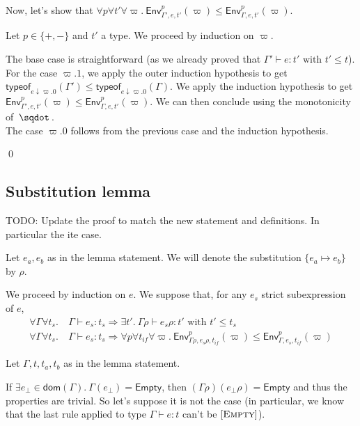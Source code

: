 \documentclass[a4paper]{article}%
\newcommand{\worra}[2]{#1\mathop{\,\sqdot\,} #2}
\newcommand{\dom}[1]{\textsf{dom}(#1)}
\newcommand{\Empty} {\textsf{Empty}}%
\newcommand{\subst}[2]{\{#1 \mapsto #2\}}
\newcommand{\tyof}[2]{\textsf{typeof}_{#2}(#1)}
\newcommand{\Gp}[2]{\textsf{Env}^{#1}_{#2}}
\theoremstyle{definition}
\newcommand {\Rule}[1] {[\textsc{#1}]}
\begin{document}
        Now, let's show that $\forall p \forall t' \forall \varpi.\ \Gp p {\Gamma',e,t'} (\varpi) \leq \Gp p {\Gamma,e,t'} (\varpi)$.
    
        Let $p\in \{+,-\}$ and $t'$ a type.
        We proceed by induction on $\varpi$.
        
        The base case is straightforward (as we already proved that $\Gamma' \vdash e:t' \text{ with } t' \leq t$).\\
        For the case $\varpi.1$, we apply the outer induction hypothesis to get $\tyof {\Gamma'} {e\downarrow\varpi.0} \leq \tyof {\Gamma} {e\downarrow\varpi.0}$.
        We apply the induction hypothesis to get $\Gp p {\Gamma',e,t'} (\varpi) \leq \Gp p {\Gamma,e,t'} (\varpi)$. We can then conclude using the monotonicity of $\worra {} {}$.\\
        The case $\varpi.0$ follows from the previous case and the induction hypothesis.
    
        \qed
    
        \subsection{Substitution lemma}

        TODO: Update the proof to match the new statement and definitions. In particular the ite case.
    
        Let $e_a,e_b$ as in the lemma statement. We will denote the substitution $\subst {e_a} {e_b}$ by $\rho$.
    
        We proceed by induction on $e$. We suppose that, for any $e_s$ strict subexpression of $e$,
        \begin{align*}
          \forall \Gamma \forall t_s.\ &\Gamma \vdash e_s:t_s \Rightarrow \exists t'.\ \Gamma \rho \vdash e_s \rho:t' \text{ with } t'\leq t_s\\
          \forall \Gamma \forall t_s.\ &\Gamma \vdash e_s:t_s \Rightarrow \forall p \forall t_{if} \forall \varpi.\ \Gp p {\Gamma\rho,e_s\rho,t_{if}} (\varpi) \leq \Gp p {\Gamma,e_s,t_{if}} (\varpi)
        \end{align*}
    
        Let $\Gamma,t,t_a,t_b$ as in the lemma statement.
    
        If $\exists e_\bot \in \dom {\Gamma}.\ \Gamma(e_\bot) = \Empty$, then $(\Gamma\rho)(e_\bot\rho) = \Empty$ and thus the properties are trivial.
        So let's suppose it is not the case (in particular, we know that the last rule applied to type $\Gamma \vdash e:t$ can't be $\Rule{Empty}$).
    
\end{document}
